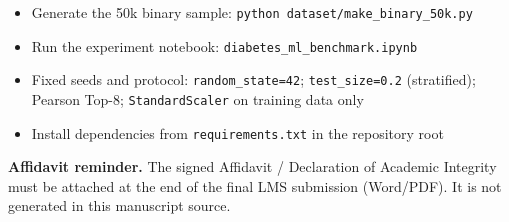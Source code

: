 \documentclass[11pt,a4paper]{article}
\begin{document}
\begin{appendices}
\begin{itemize}[leftmargin=*]
  \item Generate the 50k binary sample: \lstinline{python dataset/make_binary_50k.py}
  \item Run the experiment notebook: \lstinline{diabetes_ml_benchmark.ipynb}
  \item Fixed seeds and protocol: \lstinline{random_state=42}; \lstinline{test_size=0.2} (stratified); Pearson Top-8; \lstinline{StandardScaler} on training data only
  \item Install dependencies from \lstinline{requirements.txt} in the repository root
\end{itemize}

\noindent\textbf{Affidavit reminder.}
The signed Affidavit / Declaration of Academic Integrity must be attached at the end of the final LMS submission (Word/PDF). It is not generated in this manuscript source.

\end{appendices}
\end{document}
